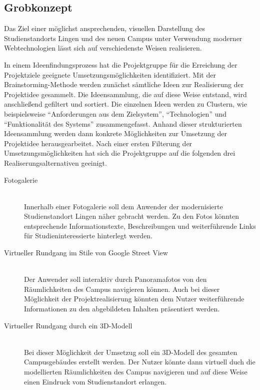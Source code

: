 \subsection{Grobkonzept}
\label{sec:Grobkonzept}

Das Ziel einer möglichst ansprechenden, visuellen Darstellung des
Studienstandorts Lingen und des neuen Campus unter Verwendung moderner
Webtechnologien lässt sich auf verschiedenste Weisen realisieren. 

In einem Ideenfindungsprozess hat die Projektgruppe für die Erreichung der
Projektziele geeignete Umsetzungsmöglichkeiten identifiziert. Mit der
Brainstorming-Methode werden zunächst sämtliche Ideen zur Realisierung der
Projektidee gesammelt. Die Ideensammlung, die auf diese Weise entstand, wird
anschließend gefiltert und sortiert. Die einzelnen Ideen werden zu Clustern, wie
beispielsweise "`Anforderungen aus dem Zielsystem"', "`Technologien"' und
"`Funktionalität des Systems"' zusammengefasst. Anhand dieser strukturierten
Ideensammlung werden dann konkrete Möglichkeiten zur Umsetzung der Projektidee
herausgearbeitet. Nach einer ersten Filterung der Umsetzungsmöglichkeiten hat
sich die Projektgruppe auf die folgenden drei Realiserungsalternativen geeinigt. 

\begin{description}
\item[Fotogalerie] \hfill \\
Innerhalb einer Fotogalerie soll dem Anwender der modernisierte Studienstandort
Lingen näher gebracht werden. Zu den Fotos könnten entsprechende
Informationstexte, Beschreibungen und weiterführende Links für
Studieninteressierte hinterlegt werden.

\item[Virtueller Rundgang im Stile von Google Street View] \hfill \\
Der Anwender soll interaktiv durch Panoramafotos von den Räumlichkeiten des
Campus navigieren können. Auch bei dieser Möglichkeit der Projektrealisierung
könnten dem Nutzer weiterführende Informationen zu den abgebildeten Inhalten
präsentiert werden.

\item[Virtueller Rundgang durch ein 3D-Modell] \hfill \\
Bei dieser Möglichkeit der Umsetzug soll ein 3D-Modell des gesamten
Campusgebäudes erstellt werden. Der Nutzer könnte dann virtuell duch die
modellierten Räumlichkeiten des Campus navigieren und auf diese Weise einen
Eindruck vom Studienstandort erlangen.
\end{description}

